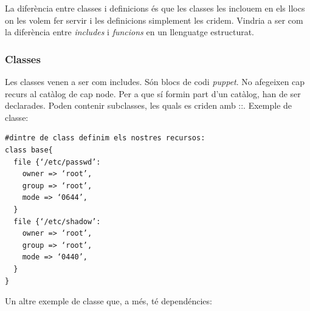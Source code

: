\documentclass[a4paper]{article}
\begin{document}
La diferència entre classes i definicions \'es que les classes les inclouem en els llocs on les volem fer servir i les definicions simplement les cridem. Vindria a ser com la diferència entre \textit{includes} i \textit{funcions} en un llenguatge estructurat.
\subsubsection{Classes}
Les classes venen a ser com includes. Són blocs de codi \textit{puppet}. No afegeixen cap recurs al catàlog de cap node. Per a que sí formin part d'un catàlog, han de ser declarades. Poden contenir subclasses, les quals es criden amb ::. Exemple de classe:
\begin{verbatim}
#dintre de class definim els nostres recursos:
class base{
  file {‘/etc/passwd’:
    owner => ‘root’,
    group => ‘root’,
    mode => ‘0644’,
  }
  file {‘/etc/shadow’:
    owner => ‘root’,
    group => ‘root’,
    mode => ‘0440’,
  }
}
\end{verbatim}
Un altre exemple de classe que, a m\'es, t\'e depend\'encies:\\

\begin{figure}[h]
	\centering
	\\ 
\end{figure}
\end{document}
